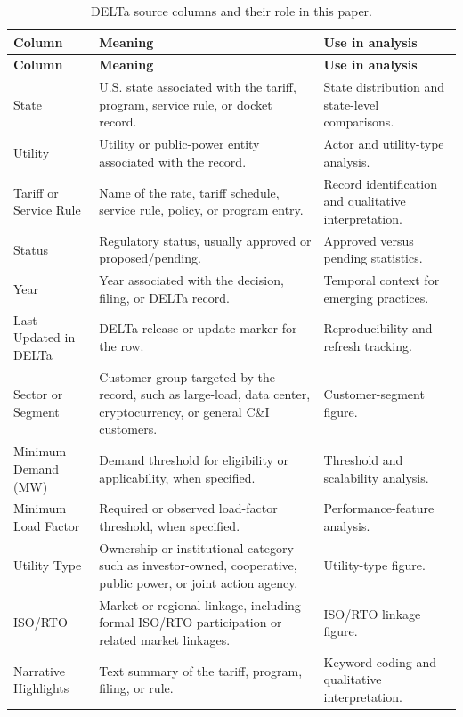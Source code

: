 \documentclass[11pt]{article}
\begin{document}
\small
\begin{longtable}{>{\raggedright\arraybackslash}p{}>{\raggedright\arraybackslash}p{}>{\raggedright\arraybackslash}p{}}
\caption{DELTa source columns and their role in this paper.}\label{tab:delta-columns}\\
\toprule
\textbf{Column} & \textbf{Meaning} & \textbf{Use in analysis} \\
\midrule
\endfirsthead
\toprule
\textbf{Column} & \textbf{Meaning} & \textbf{Use in analysis} \\
\midrule
\endhead
\bottomrule
\endfoot
State & U.S. state associated with the tariff, program, service rule, or docket record. & State distribution and state-level comparisons. \\
Utility & Utility or public-power entity associated with the record. & Actor and utility-type analysis. \\
Tariff or Service Rule & Name of the rate, tariff schedule, service rule, policy, or program entry. & Record identification and qualitative interpretation. \\
Status & Regulatory status, usually approved or proposed/pending. & Approved versus pending statistics. \\
Year & Year associated with the decision, filing, or DELTa record. & Temporal context for emerging practices. \\
Last Updated in DELTa & DELTa release or update marker for the row. & Reproducibility and refresh tracking. \\
Sector or Segment & Customer group targeted by the record, such as large-load, data center, cryptocurrency, or general C\&I customers. & Customer-segment figure. \\
Minimum Demand (MW) & Demand threshold for eligibility or applicability, when specified. & Threshold and scalability analysis. \\
Minimum Load Factor & Required or observed load-factor threshold, when specified. & Performance-feature analysis. \\
Utility Type & Ownership or institutional category such as investor-owned, cooperative, public power, or joint action agency. & Utility-type figure. \\
ISO/RTO & Market or regional linkage, including formal ISO/RTO participation or related market linkages. & ISO/RTO linkage figure. \\
Narrative Highlights & Text summary of the tariff, program, filing, or rule. & Keyword coding and qualitative interpretation. \\

\end{longtable}
\end{document}
